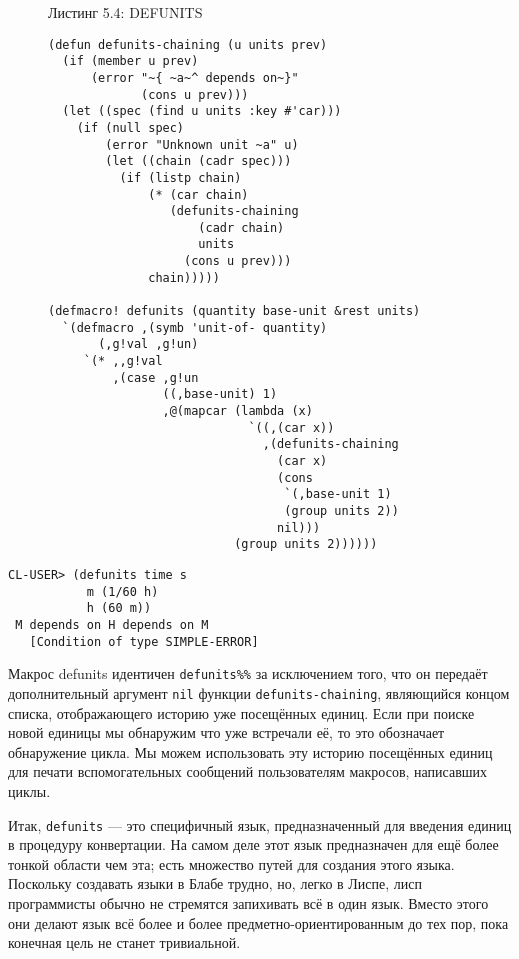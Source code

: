 \begin{figure}Листинг 5.4: DEFUNITS\label{listing_5.4}
\listbegin
\begin{verbatim}
(defun defunits-chaining (u units prev)
  (if (member u prev)
      (error "~{ ~a~^ depends on~}"
             (cons u prev)))
  (let ((spec (find u units :key #'car)))
    (if (null spec)
        (error "Unknown unit ~a" u)
        (let ((chain (cadr spec)))
          (if (listp chain)
              (* (car chain)
                 (defunits-chaining
                     (cadr chain)
                     units
                   (cons u prev)))
              chain)))))

(defmacro! defunits (quantity base-unit &rest units)
  `(defmacro ,(symb 'unit-of- quantity)
       (,g!val ,g!un)
     `(* ,,g!val
         ,(case ,g!un
                ((,base-unit) 1)
                ,@(mapcar (lambda (x)
                            `((,(car x))
                              ,(defunits-chaining
                                (car x)
                                (cons
                                 `(,base-unit 1)
                                 (group units 2))
                                nil)))
                          (group units 2))))))
\end{verbatim}
\listend
\end{figure}

\begin{verbatim}
CL-USER> (defunits time s
           m (1/60 h)
           h (60 m))
 M depends on H depends on M
   [Condition of type SIMPLE-ERROR]
\end{verbatim}

Макрос defunits идентичен \verb"defunits%%" за исключением того, что он передаёт дополнительный аргумент \verb"nil" функции \verb"defunits-chaining", являющийся концом списка, отображающего историю уже посещённых единиц. Если при поиске новой единицы мы обнаружим что уже встречали её, то это обозначает обнаружение цикла. Мы можем использовать эту историю посещённых единиц для печати вспомогательных сообщений пользователям макросов, написавших циклы.

Итак, \verb"defunits" --- это специфичный язык, предназначенный для введения единиц в процедуру конвертации. На самом деле этот язык предназначен для ещё более тонкой области чем эта; есть множество путей для создания этого языка. Поскольку создавать языки в Блабе трудно, но, легко в Лиспе, лисп программисты обычно не стремятся запихивать всё в один язык. Вместо этого они делают язык всё более и более предметно-ориентированным до тех пор, пока конечная цель не станет тривиальной.

